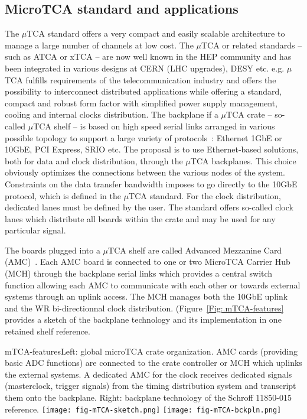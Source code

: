 \subsection{MicroTCA standard and applications}

The $\mu$TCA standard offers a very compact and easily scalable architecture to manage a large number of channels at low cost. The $\mu$TCA or related standards -- such as ATCA or xTCA -- are now well known in the HEP community and has been integrated in various designs at CERN (LHC upgrades), DESY etc. e.g.  $\mu$TCA fulfills requirements of the telecommunication industry and offers the possibility to interconnect distributed applications while offering a standard, compact and robust form factor with simplified power supply management, cooling and internal clocks distribution.
The backplane if a $\mu$TCA crate -- so-called $\mu$TCA shelf -- is based on high speed serial links arranged in various possible topology to support a large variety of protocols~: Ethernet 1GbE or 10GbE, PCI Express, SRIO etc. The proposal is to use Ethernet-based solutions, both for data and clock distribution, through the $\mu$TCA backplanes. This choice obviously optimizes the connections between the various nodes of the system. Constraints on the data transfer bandwidth imposes to go directly to the 10GbE protocol, which is defined in the $\mu$TCA standard. For the clock distribution, dedicated lanes must be defined by the user. The standard offers so-called clock lanes which distribute all boards within the crate and may be used for any particular signal. 

The boards plugged into a $\mu$TCA shelf are called Advanced Mezzanine Card (AMC)~\cite{picmg-2006}. Each AMC board is connected to one or two MicroTCA Carrier Hub (MCH) through the backplane serial links which provides a central switch function allowing each AMC to communicate with each other or towards external systems through an uplink access. The MCH manages both the 10GbE uplink and the WR bi-directionnal clock distribution.  
 (Figure~\ref{Fig:.mTCA-features} provides a sketch of the backplane technology and its implementation in one retained shelf reference.\\ 

\begin{cdrfigure}{mTCA-features}{\small Left: global microTCA crate organization. AMC cards (providing basic ADC functions) are connected to the crate controller or MCH which uplinks the external systems. A dedicated AMC for the clock receives dedicated signals (masterclock, trigger signals) from the timing distribution system and transcript them onto the backplane. Right: backplane technology of the Schroff 11850-015 reference.}
\texttt{[image: fig-mTCA-sketch.png]}\hfill
\texttt{[image: fig-mTCA-bckpln.png]}
\end{cdrfigure}



